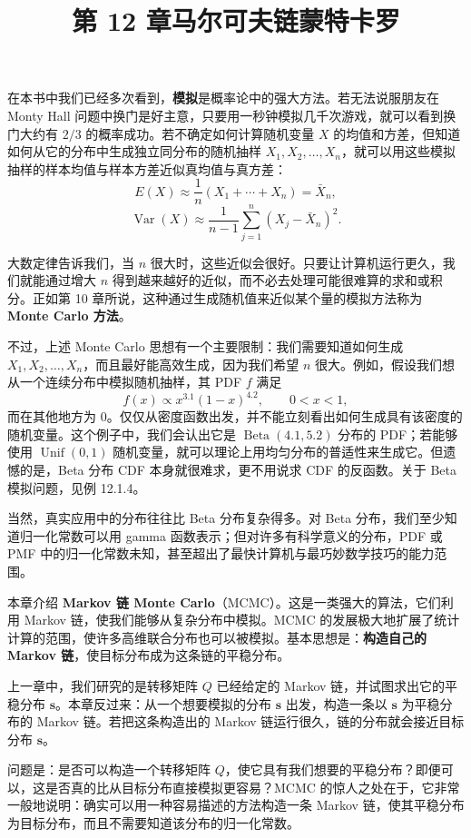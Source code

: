\documentclass[UTF8,12pt,a4paper,fontset=fandol]{ctexart}
\title{第 12 章\quad 马尔可夫链蒙特卡罗}
\author{}
\date{}
\begin{document}
\maketitle

在本书中我们已经多次看到，\textbf{模拟}是概率论中的强大方法。若无法说服朋友在 Monty Hall 问题中换门是好主意，只要用一秒钟模拟几千次游戏，就可以看到换门大约有 $2/3$ 的概率成功。若不确定如何计算随机变量 $X$ 的均值和方差，但知道如何从它的分布中生成独立同分布的随机抽样 $X_1,X_2,\ldots,X_n$，就可以用这些模拟抽样的样本均值与样本方差近似真均值与真方差：
\[
  E(X)\approx \frac1n(X_1+\cdots+X_n)=\bar X_n,
\]
\[
  \operatorname{Var}(X)\approx
  \frac{1}{n-1}\sum_{j=1}^{n}(X_j-\bar X_n)^2.
\]

大数定律告诉我们，当 $n$ 很大时，这些近似会很好。只要让计算机运行更久，我们就能通过增大 $n$ 得到越来越好的近似，而不必去处理可能很难算的求和或积分。正如第 10 章所说，这种通过生成随机值来近似某个量的模拟方法称为 \textbf{Monte Carlo 方法}。

不过，上述 Monte Carlo 思想有一个主要限制：我们需要知道如何生成 $X_1,X_2,\ldots,X_n$，而且最好能高效生成，因为我们希望 $n$ 很大。例如，假设我们想从一个连续分布中模拟随机抽样，其 PDF $f$ 满足
\[
  f(x)\propto x^{3.1}(1-x)^{4.2},\qquad 0<x<1,
\]
而在其他地方为 $0$。仅仅从密度函数出发，并不能立刻看出如何生成具有该密度的随机变量。这个例子中，我们会认出它是 $\operatorname{Beta}(4.1,5.2)$ 分布的 PDF；若能够使用 $\operatorname{Unif}(0,1)$ 随机变量，就可以理论上用均匀分布的普适性来生成它。但遗憾的是，Beta 分布 CDF 本身就很难求，更不用说求 CDF 的反函数。关于 Beta 模拟问题，见例 12.1.4。

当然，真实应用中的分布往往比 Beta 分布复杂得多。对 Beta 分布，我们至少知道归一化常数可以用 gamma 函数表示；但对许多有科学意义的分布，PDF 或 PMF 中的归一化常数未知，甚至超出了最快计算机与最巧妙数学技巧的能力范围。

本章介绍 \textbf{Markov 链 Monte Carlo}（MCMC）。这是一类强大的算法，它们利用 Markov 链，使我们能够从复杂分布中模拟。MCMC 的发展极大地扩展了统计计算的范围，使许多高维联合分布也可以被模拟。基本思想是：\textbf{构造自己的 Markov 链}，使目标分布成为这条链的平稳分布。

上一章中，我们研究的是转移矩阵 $Q$ 已经给定的 Markov 链，并试图求出它的平稳分布 $\mathbf s$。本章反过来：从一个想要模拟的分布 $\mathbf s$ 出发，构造一条以 $\mathbf s$ 为平稳分布的 Markov 链。若把这条构造出的 Markov 链运行很久，链的分布就会接近目标分布 $\mathbf s$。

问题是：是否可以构造一个转移矩阵 $Q$，使它具有我们想要的平稳分布？即便可以，这是否真的比从目标分布直接模拟更容易？MCMC 的惊人之处在于，它非常一般地说明：确实可以用一种容易描述的方法构造一条 Markov 链，使其平稳分布为目标分布，而且不需要知道该分布的归一化常数。
\end{document}

